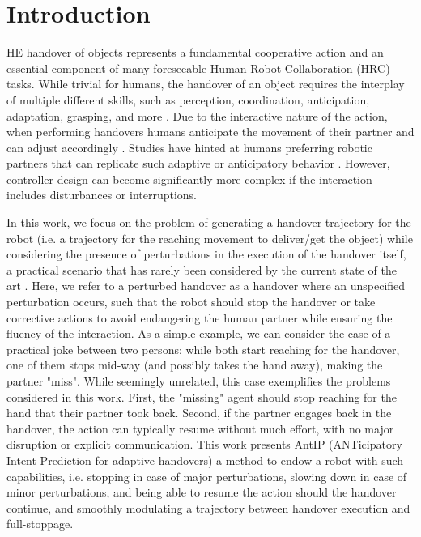 \documentclass[lettersize,journal]{IEEEtran}
\begin{document}
\section{Introduction}
\label{sec:introduction}

\noindent {}HE handover of objects represents a fundamental cooperative action and an essential component of many foreseeable Human-Robot Collaboration (HRC) tasks.
While trivial for humans, the handover of an object requires the interplay of multiple different skills, such as perception, coordination, anticipation, adaptation, grasping, and more \cite{ortenzi_object_2021}.
Due to the interactive nature of the action, when performing handovers humans anticipate the movement of their partner and can adjust accordingly \cite{controzzi_humans_2018, huber_spatiotemporal_2013}.
Studies have hinted at humans preferring robotic partners that can replicate such adaptive or anticipatory behavior \cite{huang_adaptive_2015, controzzi_humans_2018, cakmak_human_2011}.
However, controller design can become significantly more complex if the interaction includes disturbances or interruptions.

In this work, we focus on the problem of generating a handover trajectory for the robot (i.e. a trajectory for the reaching movement to deliver/get the object) while considering the presence of perturbations in the execution of the handover itself, a practical scenario that has rarely been considered by the current state of the art \cite{huang_adaptive_2015}.
Here, we refer to a perturbed handover as a handover where an unspecified perturbation occurs, such that the robot should stop the handover or take corrective actions to avoid endangering the human partner while ensuring the fluency of the interaction. 
As a simple example, we can consider the case of a practical joke between two persons: while both start reaching for the handover, one of them stops mid-way (and possibly takes the hand away), making the partner "miss".
While seemingly unrelated, this case exemplifies the problems considered in this work.
First, the "missing" agent should stop reaching for the hand that their partner took back.
Second, if the partner engages back in the handover, the action can typically resume without much effort, with no major disruption or explicit communication.
This work presents AntIP (ANTicipatory Intent Prediction for adaptive handovers) a method to endow a robot with such capabilities, i.e. stopping in case of major perturbations, slowing down in case of minor perturbations, and being able to resume the action should the handover continue, and smoothly modulating a trajectory between handover execution and full-stoppage.
\end{document}
